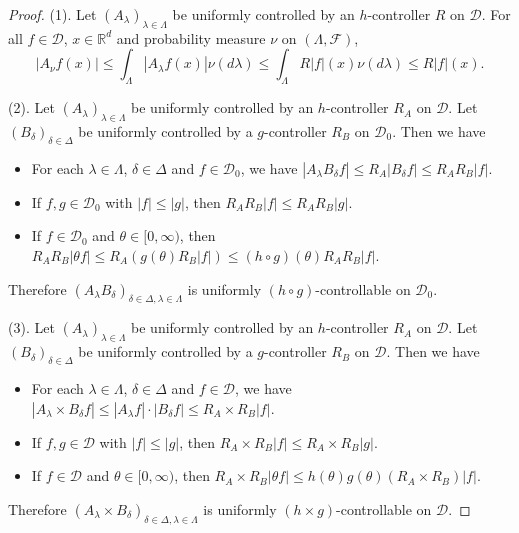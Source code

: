 \documentclass[12pt,a4paper]{amsart}
\theoremstyle{plain}
\theoremstyle{definition}
\numberwithin{equation}{section}
\begin{document}
\begin{proof}
    (1). Let $(A_\lambda)_{\lambda\in\Lambda}$ be uniformly controlled by an $h$-controller $R$ on $\mathcal D$. For all $f \in \mathcal{D}$, $x\in \mathbb R^d$ and  probability measure $\nu$ on $(\Lambda, \mathscr F)$,
\[
   |A_{\nu}f(x)|\leq \int_{\Lambda}|A_{\lambda}f(x)|\nu(d\lambda) \leq \int_{\Lambda}R|f|(x)\nu(d\lambda) \leq R|f|(x).
\]

    (2). Let $(A_\lambda)_{\lambda\in\Lambda}$ be uniformly controlled by  an $h$-controller $R_A$ on $\mathcal D$.
    Let $(B_\delta)_{\delta\in\Delta}$ be uniformly controlled by a $g$-controller $R_B$ on $\mathcal D_0$.
Then we have
\begin{itemize}
\item
    For each $\lambda \in \Lambda$, $\delta \in \Delta$ and $f\in \mathcal D_0$, we have $|A_\lambda B_\delta f| \leq R_A |B_\delta f| \leq R_A R_B |f|$.
\item
    If $f,g \in \mathcal D_0$ with $|f|\leq |g|$, then $R_AR_B|f| \leq R_A R_B |g|$.
\item
    If $f \in \mathcal D_0$ and $\theta \in [0,\infty)$, then $R_AR_B|\theta f| \leq R_A(g(\theta) R_B|f|) \leq (h\circ g)(\theta) R_A R_B |f| $.
\end{itemize}
    Therefore $(A_\lambda B_\delta)_{\delta\in \Delta, \lambda \in \Lambda}$ is uniformly $(h \circ g)$-controllable on $\mathcal D_0$.

    (3). Let $(A_\lambda)_{\lambda\in\Lambda}$ be uniformly controlled by an $h$-controller $R_A$ on $\mathcal D$.
    Let $(B_\delta)_{\delta\in\Delta}$ be uniformly controlled by a $g$-controller $R_B$ on $\mathcal D$.
%
Then we have
\begin{itemize}
\item
    For each $\lambda \in \Lambda$, $\delta \in \Delta$ and $f\in \mathcal D$, we have $|A_\lambda \times B_\delta f| \leq |A_\lambda f| \cdot |B_\delta f| \leq R_A \times R_B |f|$.
\item
    If $f,g \in \mathcal D$ with $|f|\leq |g|$, then $R_A\times R_B|f| \leq R_A\times R_B |g|$.
\item
    If $f \in \mathcal D$ and $\theta \in [0,\infty)$, then $R_A\times R_B|\theta f| \leq h(\theta) g(\theta) (R_A \times R_B) |f| $.
\end{itemize}
    Therefore $(A_\lambda \times B_\delta)_{\delta\in \Delta, \lambda \in \Lambda}$ is uniformly $(h \times g)$-controllable on $\mathcal D$.


\end{proof}
\end{document}
